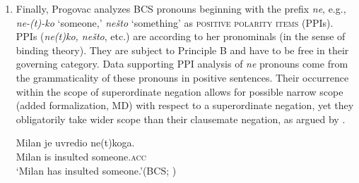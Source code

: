 \documentclass[output=paper,colorlinks,citecolor=brown]{langscibook}
\begin{document}
\begin{enumerate}
\ea\label{doc:ex:progovac2}
\ea\label{0c60bb59}\gll Da li Milan voli \textit{i(t)koga} / \minsp{*} \textit{ni(t)koga}?\\
that \textsc{q} Milan loves anyone {} {} \textsc{neg}.person.\textsc{acc}\\
\glt (Intended:) `Does Milan love anyone?'
\ex\label{8e15c015}\gll Akor Milan povredi \textit{i(t)koga} / \minsp{*} \textit{ni(t)koga}, bi-\'{c}e kažnjen.\\
if Milan hurts anyone.\textsc{acc} {} {} \textsc{neg}.person.\textsc{acc} be.\textsc{fut} punished\\
\glt (Intended:) `If Milan hurts anyone, he will be punished.'
\ex\label{55c25e1a}\gll Sumnjam da Milan voli \textit{i(t)koga} / \minsp{*} \textit{ni(t)koga}.\\
doubt.\textsc{1.sg} that Milan loves anyone.\textsc{acc} {} {} \textsc{neg}.person.\textsc{acc}\\
\glt `I doubt that Milan loves anyone.'
\ex\label{7a73e0a5}\gll Svako (t)ko povredi \textit{i(t)koga} / \minsp{*} \textit{ni(t)koga}, mora bit kažnjen.\\
everyone who injures anyone.\textsc{acc} {} {} \textsc{neg}.person.\textsc{acc} must be punished\\
\glt `Everyone who injures anyone must be punished.'\\\hfill (BCS; \citealt{progovac1994negative})
\z\z


\item Finally, Progovac analyzes BCS pronouns beginning with the prefix \textit{ne}, e.g., \textit{ne-(t)-ko} `someone,' \textit{nešto} `something' as \textsc{positive polarity items} (PPIs). PPIs (\textit{ne(t)ko, nešto}, etc.) are according to her pronominals (in the sense of binding theory). They are subject to Principle B and have to be free in their governing category. Data supporting PPI analysis of \textit{ne} pronouns come from the grammaticality of these pronouns in positive sentences. Their occurrence within the scope of superordinate negation allows for possible narrow scope (added formalization, MD) with respect to a superordinate negation, yet they obligatorily take wider scope than their clausemate negation, as argued by \citet{progovac1994negative}. %

\ea\label{11f1dc0b}\gll Milan je uvredio ne(t)koga.\\
Milan is insulted someone.\textsc{acc}\\
\glt `Milan has insulted someone.'\hfill (BCS; \citealt{progovac1994negative})
\z


\end{enumerate}
\end{document}

